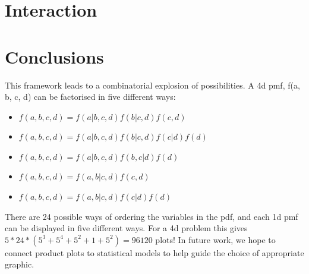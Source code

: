 \documentclass[journal]{vgtc}
\begin{document}
\section{Interaction}
\label{sec:interaction}



\section{Conclusions}

This framework leads to a combinatorial explosion of possibilities. A 4d pmf, f(a, b, c, d) can be factorised in five different ways:

\begin{itemize}
  \item $f(a, b, c, d) = f(a | b, c, d) f(b | c, d) f(c, d)$
  \item $f(a, b, c, d) = f(a | b, c, d) f(b | c, d) f(c | d) f(d)$
  \item $f(a, b, c, d) = f(a | b, c, d) f(b, c | d) f(d)$
  \item $f(a, b, c, d) = f(a, b | c, d) f(c, d)$
  \item $f(a, b, c, d) = f(a, b | c, d) f(c | d) f(d)$
\end{itemize}

\noindent There are 24 possible ways of ordering the variables in the pdf, and each 1d pmf can be displayed in five different ways. For a 4d problem this gives $5 * 24 * (5^3 + 5^4 + 5^2 + 1 + 5^2) = 96120$ plots!  In future work, we hope to connect product plots to statistical models to help guide the choice of appropriate graphic.




\end{document}
